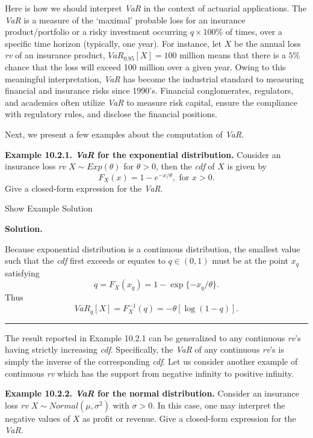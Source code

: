 \documentclass[]{book}
\theoremstyle{definition}
\theoremstyle{definition}
\theoremstyle{definition}
\theoremstyle{remark}
\begin{document}
Here is how we should interpret \emph{VaR} in the context of actuarial
applications. The \emph{VaR} is a measure of the `maximal' probable loss
for an insurance product/portfolio or a risky investment occurring
\(q\times 100\%\) of times, over a specific time horizon (typically, one
year). For instance, let \(X\) be the annual loss \emph{rv} of an
insurance product, \(VaR_{0.95}[X]=100\) million means that there is a
\(5\%\) chance that the loss will exceed 100 million over a given year.
Owing to this meaningful interpretation, \emph{VaR} has become the
industrial standard to measuring financial and insurance risks since
1990's. Financial conglomerates, regulators, and academics often utilize
\emph{VaR} to measure risk capital, ensure the compliance with
regulatory rules, and disclose the financial positions.

Next, we present a few examples about the computation of \emph{VaR}.

\textbf{Example 10.2.1. \emph{VaR} for the exponential distribution.}
Consider an insurance loss \emph{rv} \(X\sim Exp(\theta)\) for
\(\theta>0\), then the \emph{cdf} of \(X\) is given by \[
F_X(x)=1-e^{-x/\theta}, \text{ for } x>0.
\] Give a closed-form expression for the \emph{VaR}.

Show Example Solution

\hypertarget{toggleExamplePortMgt.2.1}{}
\textbf{Solution.}

Because exponential distribution is a continuous distribution, the
smallest value such that the \emph{cdf} first exceeds or equates to
\(q \in (0,1)\) must be at the point \(x_q\) satisfying \[
q=F_X(x_q)=1-\exp\{-x_q/\theta \}.
\] Thus \[
VaR_q[X]=F_X^{-1}(q)=-\theta[\log(1-q)].
\]

\begin{center}\rule{0.5\linewidth}{\linethickness}\end{center}

The result reported in Example 10.2.1 can be generalized to any
continuous \emph{rv}'s having strictly increasing \emph{cdf}.
Specifically, the \emph{VaR} of any continuous \emph{rv}'s is simply the
inverse of the corresponding \emph{cdf}. Let us consider another example
of continuous \emph{rv} which has the support from negative infinity to
positive infinity.

\textbf{Example 10.2.2. \emph{VaR} for the normal distribution.}
Consider an insurance loss \emph{rv} \(X\sim Normal(\mu,\sigma^2)\) with
\(\sigma>0\). In this case, one may interpret the negative values of
\(X\) as profit or revenue. Give a closed-form expression for the
\emph{VaR}.
\end{document}
